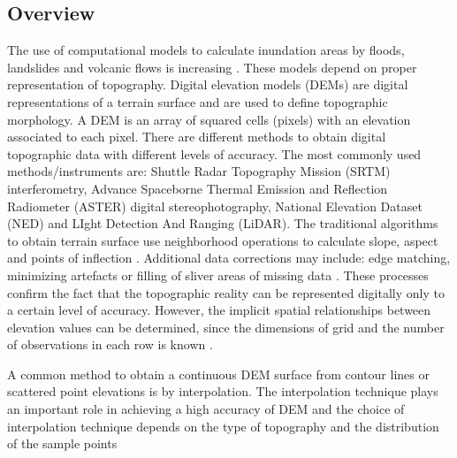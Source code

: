 \documentclass[12pt,letterpaper]{article}
\begin{document}
\subsection{Overview}
The use of computational models to calculate inundation areas by
floods, landslides and volcanic flows is increasing
\citep{Bates2000}. These models depend on proper representation of
topography. Digital elevation models (DEMs) are digital representations of a terrain
 surface and are used to define topographic morphology. 
A DEM is an array of squared cells (pixels) with an elevation associated 
to each pixel. There are different methods  to obtain digital topographic
 data with different levels of accuracy.  The most commonly used 
 methods/instruments are: Shuttle
  Radar Topography Mission (SRTM) interferometry, Advance Spaceborne
  Thermal Emission and Reflection Radiometer (ASTER) digital
  stereophotography, National Elevation Dataset (NED) and LIght
  Detection And Ranging (LiDAR).  The traditional algorithms to obtain
  terrain surface use neighborhood operations to calculate slope,
  aspect and points of inflection \citep{Jenson}. Additional data 
  corrections may include: edge matching, minimizing artefacts or 
  filling of sliver areas of missing data \citep{Zhang2008}.  
  These processes confirm the fact that the
  topographic reality can be represented digitally only to a certain
  level of accuracy.  However, the implicit spatial relationships
  between elevation values can be determined, since the dimensions of
  grid and the number of observations in each row is known \citep{Tate}.
 
 A  common method to obtain a continuous DEM surface from
 contour lines or scattered point elevations is by interpolation. The interpolation
 technique plays an important role in achieving a high accuracy of DEM
 and the choice of interpolation technique depends on the type of
 topography and the distribution of the sample points \citep{Xiao2010, Binh2008}
 
\end{document}
